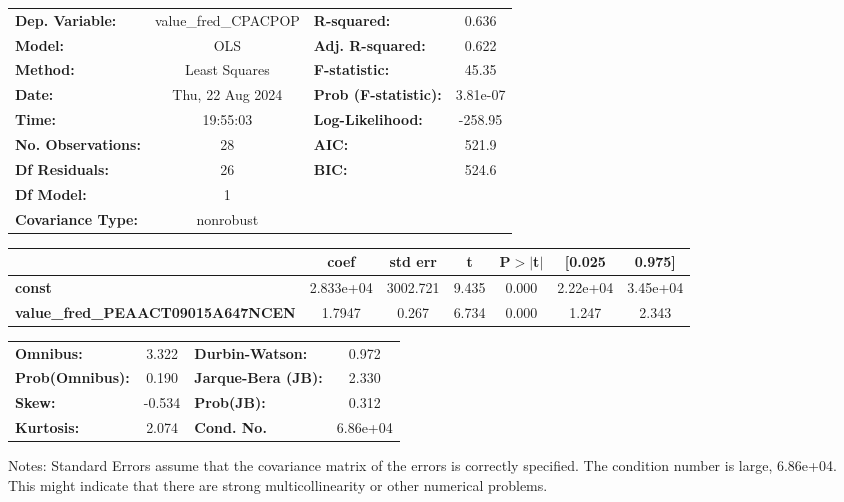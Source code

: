 \begin{center}
\begin{tabular}{lclc}
\toprule
\textbf{Dep. Variable:}                   & value\_fred\_CPACPOP & \textbf{  R-squared:         } &     0.636   \\
\textbf{Model:}                           &         OLS          & \textbf{  Adj. R-squared:    } &     0.622   \\
\textbf{Method:}                          &    Least Squares     & \textbf{  F-statistic:       } &     45.35   \\
\textbf{Date:}                            &   Thu, 22 Aug 2024   & \textbf{  Prob (F-statistic):} &  3.81e-07   \\
\textbf{Time:}                            &       19:55:03       & \textbf{  Log-Likelihood:    } &   -258.95   \\
\textbf{No. Observations:}                &            28        & \textbf{  AIC:               } &     521.9   \\
\textbf{Df Residuals:}                    &            26        & \textbf{  BIC:               } &     524.6   \\
\textbf{Df Model:}                        &             1        & \textbf{                     } &             \\
\textbf{Covariance Type:}                 &      nonrobust       & \textbf{                     } &             \\
\bottomrule
\end{tabular}
\begin{tabular}{lcccccc}
                                          & \textbf{coef} & \textbf{std err} & \textbf{t} & \textbf{P$> |$t$|$} & \textbf{[0.025} & \textbf{0.975]}  \\
\midrule
\textbf{const}                            &    2.833e+04  &     3002.721     &     9.435  &         0.000        &     2.22e+04    &     3.45e+04     \\
\textbf{value\_fred\_PEAACT09015A647NCEN} &       1.7947  &        0.267     &     6.734  &         0.000        &        1.247    &        2.343     \\
\bottomrule
\end{tabular}
\begin{tabular}{lclc}
\textbf{Omnibus:}       &  3.322 & \textbf{  Durbin-Watson:     } &    0.972  \\
\textbf{Prob(Omnibus):} &  0.190 & \textbf{  Jarque-Bera (JB):  } &    2.330  \\
\textbf{Skew:}          & -0.534 & \textbf{  Prob(JB):          } &    0.312  \\
\textbf{Kurtosis:}      &  2.074 & \textbf{  Cond. No.          } & 6.86e+04  \\
\bottomrule
\end{tabular}
\end{center}

Notes: \newline
 [1] Standard Errors assume that the covariance matrix of the errors is correctly specified. \newline
 [2] The condition number is large, 6.86e+04. This might indicate that there are \newline
 strong multicollinearity or other numerical problems.